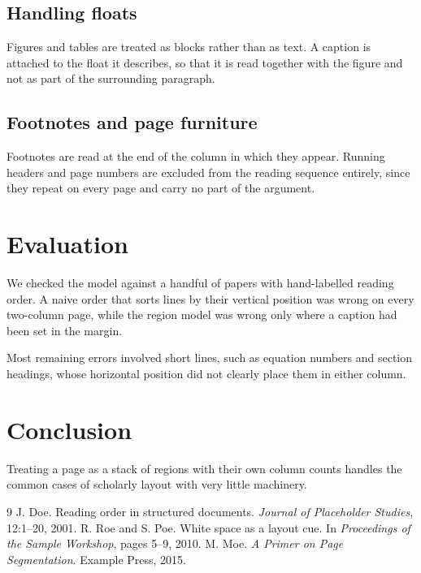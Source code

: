 \documentclass[10pt,twocolumn]{article}
\begin{document}
\newpage
\subsection{Handling floats}

Figures and tables are treated as blocks rather than as text. A caption is
attached to the float it describes, so that it is read together with the
figure and not as part of the surrounding paragraph.

\subsection{Footnotes and page furniture}

Footnotes are read at the end of the column in which they appear. Running
headers and page numbers are excluded from the reading sequence entirely,
since they repeat on every page and carry no part of the argument.

\newpage
\section{Evaluation}

We checked the model against a handful of papers with hand-labelled reading
order. A naive order that sorts lines by their vertical position was wrong on
every two-column page, while the region model was wrong only where a caption
had been set in the margin.

Most remaining errors involved short lines, such as equation numbers and
section headings, whose horizontal position did not clearly place them in
either column.

\newpage
\section{Conclusion}

Treating a page as a stack of regions with their own column counts handles
the common cases of scholarly layout with very little machinery.

\begin{thebibliography}{9}
 J. Doe. Reading order in structured documents. \emph{Journal
  of Placeholder Studies}, 12:1--20, 2001.
 R. Roe and S. Poe. White space as a layout cue. In
  \emph{Proceedings of the Sample Workshop}, pages 5--9, 2010.
 M. Moe. \emph{A Primer on Page Segmentation}. Example Press,
  2015.
\end{thebibliography}
\end{document}
